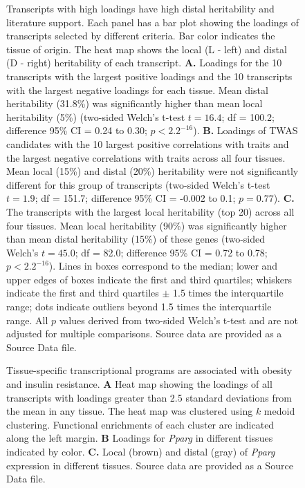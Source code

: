\documentclass[
]{article}
\begin{document}
\begin{figure}[ht!]
\caption{Transcripts with high loadings have high distal heritability 
and literature support. Each panel has a bar plot showing 
the loadings of transcripts selected by different criteria. 
Bar color indicates the tissue of origin. The heat map 
shows the local (L - left) and distal (D - right) heritability 
of each transcript. \textbf{A.} Loadings for the 10 
transcripts with the largest positive loadings and the 10 
transcripts with the largest negative loadings for each tissue. 
Mean distal heritability (31.8\%) was significantly higher than 
mean local heritability (5\%) (two-sided Welch's 
t-test $t = 16.4$; df = 100.2; difference 95\% CI = 0.24 to 
0.30; $p < 2.2^{-16}$). \textbf{B.} Loadings of TWAS 
candidates with the 10 largest positive correlations with 
traits and the largest negative correlations with traits across 
all four tissues. Mean local (15\%) and distal (20\%) heritability
were not significantly different for this group of transcripts 
(two-sided Welch's t-test $t = 1.9$; df = 151.7; difference 95\% 
CI = -0.002 to 0.1; $p = 0.77$). \textbf{C.} The transcripts 
with the largest local heritability (top 20) across all four 
tissues. Mean local heritability (90\%) was significantly higher 
than mean distal heritability (15\%) of these genes 
(two-sided Welch's $t = 45.0$; df = 82.0; difference 95\% 
CI = 0.72 to 0.78; $p < 2.2^{-16}$). Lines in boxes correspond 
to the median; lower and upper edges of boxes indicate the 
first and third quartiles; whiskers indicate the first and 
third quartiles $\pm$ 1.5 times the interquartile range; dots 
indicate outliers beyond 1.5 times the interquartile range. All 
$p$ values derived from two-sided Welch's t-test and are 
not adjusted for multiple comparisons. Source data are 
provided as a Source Data file.
}
\label{fig:loading_heritability}
\end{figure}

\begin{figure}[ht!]
\caption{Tissue-specific transcriptional programs are 
associated with obesity and insulin resistance. \textbf{A} 
Heat map showing the loadings of all transcripts with 
loadings greater than 2.5 standard deviations from the 
mean in any tissue. The heat map was clustered using 
$k$ medoid clustering. Functional enrichments of each 
cluster are indicated along the left margin. \textbf{B} 
Loadings for \textit{Pparg} in different tissues indicated 
by color. \textbf{C.} Local (brown) and distal (gray) of 
\textit{Pparg} expression in different tissues. Source data 
are provided as a Source Data file.
}
\label{fig:toa}
\end{figure}
\end{document}
